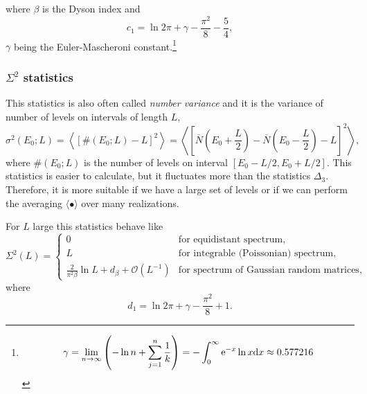\documentclass[a4paper,11pt,twoside]{article}
\begin{document}
            where $\beta$ is the Dyson index and
            \begin{equation}
                c_{1}=\ln{2\pi}+\gamma-\frac{\pi^{2}}{8}-\frac{5}{4},
            \end{equation}
            $\gamma$ being the Euler-Mascheroni constant.\footnote{
                \begin{equation}
                    \gamma
                        =\lim_{n\rightarrow\infty}\left(-\ln{n}+\sum_{j=1}^{n}\frac{1}{k}\right)
                        =-\int_{0}^{\infty}\operatorname{e}^{-x}\ln{x}\mathrm{d} x\approx0.577216
                \end{equation}
            }

        \subsubsection{$\Sigma^{2}$ statistics}
            This statistics is also often called \emph{number variance} and it is the variance of number of levels on intervals of length $L$,
            \begin{equation}
                \sigma^{2}(E_{0};L)
                    =\left\langle\left[\#(E_{0};L)-L\right]^{2}\right\rangle
                    =\left\langle\left[\overline{N}\left(E_{0}+\frac{L}{2}\right)-\overline{N}\left(E_{0}-\frac{L}{2}\right)-L\right]^{2}\right\rangle,
                \label{eq:Sigma2}
            \end{equation}  
            where $\#(E_{0};L)$ is the number of levels on interval $[E_{0}-L/2,E_{0}+L/2]$.
            This statistics is easier to calculate, but it fluctuates more than the statistics $\Delta_{3}$.
            Therefore, it is more suitable if we have a large set of levels or if we can perform the averaging $\langle\bullet\rangle$ over many realizations. 
            
            For $L$ large this statistics behave like
            \begin{equation}
                \Sigma^{2}(L)=\left\{\begin{array}{ll}
                    0 & \text{for equidistant spectrum},\\
                    L & \text{for integrable (Poissonian) spectrum},\\
                    \frac{2}{\pi^{2}\beta}\ln L+d_{\beta}+\mathcal{O}(L^{-1}) & \text{for spectrum of Gaussian random matrices},
                \end{array}\right.
            \end{equation}
            where
            \begin{equation}
                d_{1}=\ln{2\pi}+\gamma-\frac{\pi^{2}}{8}+1.
            \end{equation}
\end{document}
